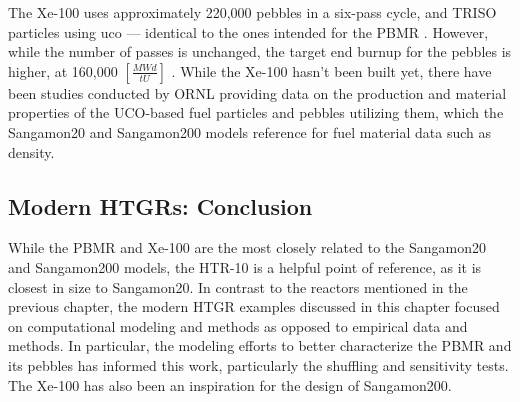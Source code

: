 The Xe-100 uses approximately 220,000 pebbles in a six-pass cycle, and TRISO particles using \acrfull{uco} --- identical to the ones intended for the PBMR \cite{harlan_x-energy_2018}.  However, while the number of passes is unchanged, the target end burnup for the pebbles is higher, at 160,000 $\left[\frac{MWd}{tU}\right]$ \cite{agnihotri_intrinsically_2017}.  While the Xe-100 hasn't been built yet, there have been studies conducted by ORNL providing data on the production and material properties of the UCO-based fuel particles \cite{helmreich_year_2017} and pebbles utilizing them, which the Sangamon20 and Sangamon200 models reference for fuel material data such as density.

\subsection{Modern HTGRs: Conclusion}

While the PBMR and Xe-100 are the most closely related to the Sangamon20 and Sangamon200 models, the HTR-10 is a helpful point of reference, as it is closest in size to Sangamon20.  In contrast to the reactors mentioned in the previous chapter, the modern HTGR examples discussed in this chapter focused on computational modeling and methods as opposed to empirical data and methods.  In particular, the modeling efforts to better characterize the PBMR and its pebbles has informed this work, particularly the shuffling and sensitivity tests.  The Xe-100 has also been an inspiration for the design of Sangamon200.